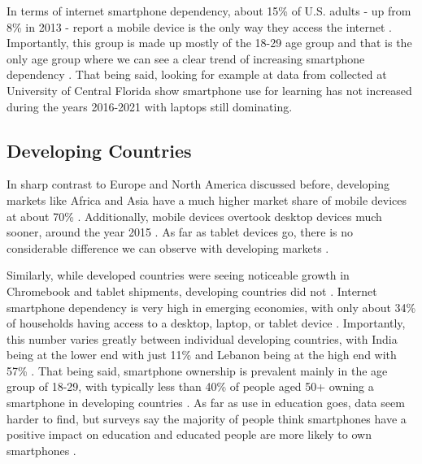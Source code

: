In terms of internet smartphone dependency, about 15\% of U.S. adults - up from 8\% in 2013 - report a mobile device is the only way they access the internet \parencite{Pew_Research_2021}.
Importantly, this group is made up mostly of the 18-29 age group and that is the only age group where we can see a clear trend of increasing smartphone dependency \parencite{Pew_Research_2021}.
That being said, looking for example at data from \textcite{Educause_2022} collected at University of Central Florida show smartphone use for learning has not increased during the years 2016-2021 with laptops still dominating.

\subsection{Developing Countries}

In sharp contrast to Europe and North America discussed before, developing markets like Africa and Asia have a much higher market share of mobile devices at about 70\% \parencites{StatCounter_Africa_2023}{StatCounter_Asia_2023}.
Additionally, mobile devices overtook desktop devices much sooner, around the year 2015 \parencites{StatCounter_Africa_2023}{StatCounter_Asia_2023}.
As far as tablet devices go, there is no considerable difference we can observe with developing markets \parencites{StatCounter_Africa_2023}{StatCounter_Asia_2023}.

Similarly, while developed countries were seeing noticeable growth in Chromebook and tablet shipments, developing countries did not \parencite{Boreham_2019}.
Internet smartphone dependency is very high in emerging economies, with only about 34\% of households having access to a desktop, laptop, or tablet device \parencite{Pew_Research_2019}.
Importantly, this number varies greatly between individual developing countries, with India being at the lower end with just 11\% and Lebanon being at the high end with 57\% \parencite{Pew_Research_2019}.
That being said, smartphone ownership is prevalent mainly in the age group of 18-29, with typically less than 40\% of people aged 50+ owning a smartphone in developing countries \parencite{Pew_Research_2019}.
As far as use in education goes, data seem harder to find, but surveys say the majority of people think smartphones have a positive impact on education and educated people are more likely to own smartphones \parencite{Pew_Research_2019}.
